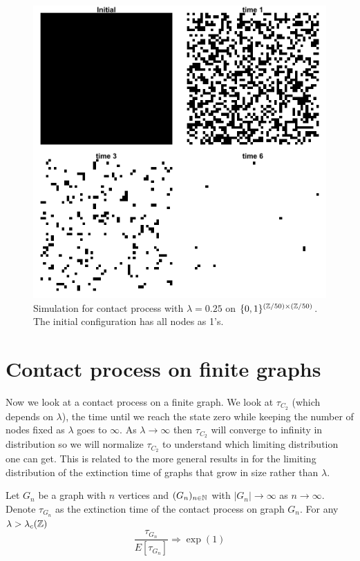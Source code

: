 \begin{figure}[H]
  \centering
    \includegraphics[width=.80\textwidth]{figures/contact_simulation_torus_25_below_crit.png}
   \caption{Simulation for contact process with $\lambda = 0.25$ on $\{0,1\}^{(\mathbb{Z}/50) \times (\mathbb{Z}/50)}$. The initial configuration has all nodes as 1's.}
  \label{fig:contact_sim_torus_below_crit.png}
\end{figure}

\section{Contact process on finite graphs}

Now we look at a contact process on a finite graph.
We look at $\tau_{C_2}$ (which depends on $\lambda$), the time until we reach the state zero while keeping the number of nodes fixed as $\lambda$ goes to $\infty$.
As $\lambda \to \infty$ then $\tau_{C_2}$ will converge to infinity in distribution so we will normalize $\tau_{C_2}$ to understand which limiting distribution one can get. This is related to the more general results in \cite{schapira2017} for the limiting distribution of the extinction time of graphs that grow in size rather than $\lambda$.

\begin{theorem}
Let $G_n$ be a graph with $n$ vertices and $(G_n)_{n \in \mathbb{N}}$ with $|G_n| \to \infty$ as $n \to \infty$.
Denote $\tau_{G_n}$ as the extinction time of the contact process on graph $G_n$.
For any $\lambda > \lambda_c(\mathbb{Z})$
$$
\frac{\tau_{G_n}}{E[\tau_{G_n}]} \Rightarrow \exp(1)
$$
\end{theorem}

